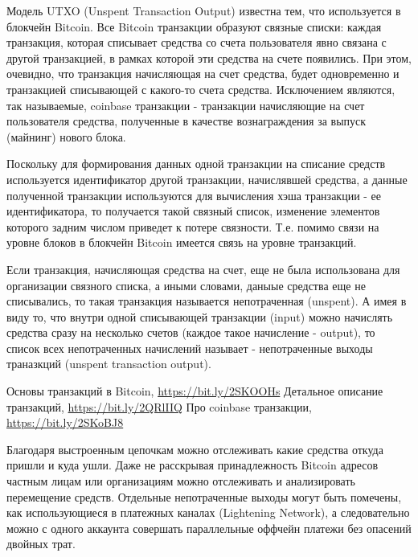 
Модель UTXO (Unspent Transaction Output) известна тем, что используется в блокчейн Bitcoin. Все Bitcoin транзакции образуют связные списки: каждая транзакция, которая списывает средства со счета пользователя явно связана с другой транзакцией, в рамках которой эти средства на счете появились. При этом, очевидно, что транзакция начисляющая на счет средства, будет одновременно и транзакцией списывающей с какого-то счета средства. Исключением являются, так называемые, coinbase транзакции - транзакции начисляющие на счет пользователя средства, полученные в качестве вознаграждения за выпуск (майнинг) нового блока. 

Поскольку для формирования данных одной транзакции на списание средств используется идентификатор другой транзакции, начислявшей средства, а данные полученной транзакции используются для вычисления хэша транзакции - ее идентификатора, то получается такой связный список, изменение элементов которого задним числом приведет к потере связности. Т.е. помимо связи на уровне блоков в блокчейн Bitcoin имеется связь на уровне транзакций. 

Если транзакция, начисляющая средства на счет, еще не была использована для организации связного списка, а иными словами, даныые средства еще не списывались, то такая транзакция называется непотраченная (unspent). А имея в виду то, что внутри одной списывающей транзакции (input) можно начислять средства сразу на несколько счетов (каждое такое начисление - output), то список всех непотраченных начислений называет - непотраченные выходы траназкций (unspent transaction output).

{Основы транзакций в Bitcoin, \url{https://bit.ly/2SKOOHs}}
{Детальное описание транзакций, \url{https://bit.ly/2QRlIIQ}}
{Про coinbase транзакции, \url{https://bit.ly/2SKoBJ8}}

{Благодаря выстроенным цепочкам можно отслеживать какие средства откуда пришли и куда ушли. Даже не расскрывая принадлежность Bitcoin адресов частным лицам или организациям можно отслеживать и анализировать перемещение средств.}
{Отдельные непотраченные выходы могут быть помечены, как использующиеся в платежных каналах (Lightening Network), а следовательно можно с одного аккаунта совершать параллельные оффчейн платежи без опасений двойных трат.}

